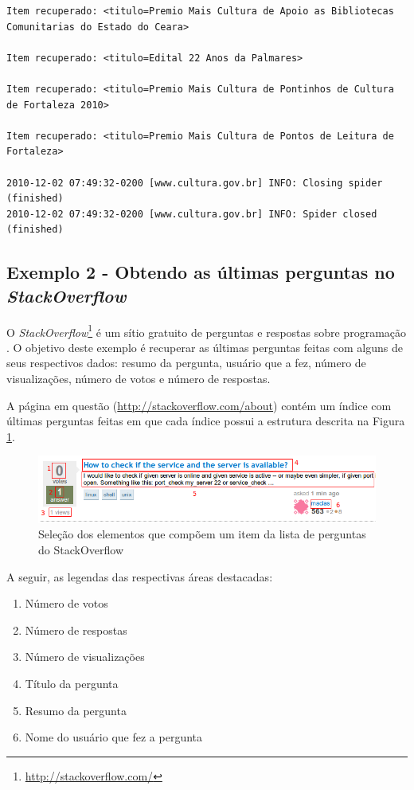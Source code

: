 \begin{lstlisting}[label=scrapy_wpt_minc]
Item recuperado: <titulo=Premio Mais Cultura de Apoio as Bibliotecas Comunitarias do Estado do Ceara> 

Item recuperado: <titulo=Edital 22 Anos da Palmares> 

Item recuperado: <titulo=Premio Mais Cultura de Pontinhos de Cultura de Fortaleza 2010> 

Item recuperado: <titulo=Premio Mais Cultura de Pontos de Leitura de Fortaleza> 

2010-12-02 07:49:32-0200 [www.cultura.gov.br] INFO: Closing spider (finished)
2010-12-02 07:49:32-0200 [www.cultura.gov.br] INFO: Spider closed (finished)
\end{lstlisting}


\subsection{Exemplo 2 - Obtendo as últimas perguntas no \textit{StackOverflow}}

O \textit{StackOverflow}\footnote{\url{http://stackoverflow.com/}} é um sítio gratuito de perguntas e respostas sobre programação \cite{stackoverflow}. O objetivo deste exemplo é recuperar as últimas perguntas feitas com alguns de seus respectivos dados: resumo da pergunta, usuário que a fez, número de visualizações, número de votos e número de respostas.

A página em questão (\url{http://stackoverflow.com/about}) contém um índice com últimas perguntas feitas em que cada índice possui a estrutura descrita na Figura \ref{stackoverflow}.

\begin{figure} [ht]
	\centering
	\includegraphics[scale=0.8]{stackoverflow.png}
	\caption{Seleção dos elementos que compõem um item da lista de perguntas do StackOverflow}
	\label{stackoverflow}
\end{figure}

A seguir, as legendas das respectivas áreas destacadas:

\begin{enumerate}
	\item Número de votos
	\item Número de respostas
	\item Número de visualizações
	\item Título da pergunta
	\item Resumo da pergunta
	\item Nome do usuário que fez a pergunta
\end{enumerate}

